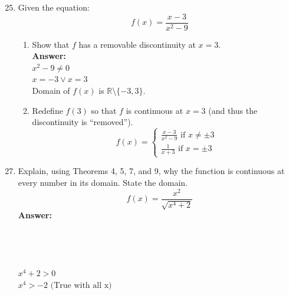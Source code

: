 \documentclass[12pt]{article}
\begin{document}
\begin{enumerate}
\setcounter{enumi}{24}
    \item Given the equation:
    \[{\displaystyle f(x) = \frac{x-3}{x^2-9}}\]
    \begin{enumerate}
        \item Show that $f$ has a removable discontinuity at $x=3$.\\
        \textbf{Answer: }\\
        $x^2 - 9 \neq 0$\\
        $x = -3 \vee x = 3$\\
        Domain of $f(x)$ is $\mathds{R} \setminus \{-3,3\}$.\\
        \noindent{}
        \item Redefine $f(3)$ so that $f$ is continuous at $x=3$ (and thus the discontinuity is “removed”).\\
        
        \[ \boxed{ f(x) = \left \{ \begin{array}{l}
        {\displaystyle \frac{x-3}{x^2-9} \text{ if } x \neq \pm 3} \\
        {\displaystyle \frac{1}{x+3}} \text{ if } x = \pm 3 \end{array} \right. } \]
    \end{enumerate}
\end{enumerate}

\begin{enumerate}
\setcounter{enumi}{26}
    \item Explain, using Theorems 4, 5, 7, and 9, why the function is continuous at every number in its domain. State the domain.
    \[ {\displaystyle f(x) = \frac{x^2}{\sqrt{x^4+2}}}\]
    \textbf{Answer: }\\~\\
    \noindent{}\\~\\~\\
    $x^4 + 2 > 0$\\
    $x^4 > -2 \text{ (True with all x)}$\\
    \noindent{}
\end{enumerate}
\end{document}
